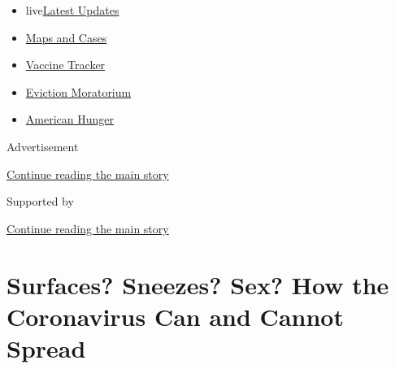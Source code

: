 \begin{itemize}
\tightlist
\item
  live\href{https://www.nytimes3xbfgragh.onion/2020/09/08/world/covid-19-coronavirus.html?name=styln-coronavirus-national\&region=TOP_BANNER\&block=storyline_menu_recirc\&action=click\&pgtype=Article\&impression_id=450a5011-f1e5-11ea-852f-a350b3d288e2\&variant=undefined}{Latest
  Updates}
\item
  \href{https://www.nytimes3xbfgragh.onion/interactive/2020/us/coronavirus-us-cases.html?name=styln-coronavirus-national\&region=TOP_BANNER\&block=storyline_menu_recirc\&action=click\&pgtype=Article\&impression_id=450a5012-f1e5-11ea-852f-a350b3d288e2\&variant=undefined}{Maps
  and Cases}
\item
  \href{https://www.nytimes3xbfgragh.onion/interactive/2020/science/coronavirus-vaccine-tracker.html?name=styln-coronavirus-national\&region=TOP_BANNER\&block=storyline_menu_recirc\&action=click\&pgtype=Article\&impression_id=450a5013-f1e5-11ea-852f-a350b3d288e2\&variant=undefined}{Vaccine
  Tracker}
\item
  \href{https://www.nytimes3xbfgragh.onion/2020/09/02/your-money/eviction-moratorium-covid.html?name=styln-coronavirus-national\&region=TOP_BANNER\&block=storyline_menu_recirc\&action=click\&pgtype=Article\&impression_id=450a5014-f1e5-11ea-852f-a350b3d288e2\&variant=undefined}{Eviction
  Moratorium}
\item
  \href{https://www.nytimes3xbfgragh.onion/interactive/2020/09/02/magazine/food-insecurity-hunger-us.html?name=styln-coronavirus-national\&region=TOP_BANNER\&block=storyline_menu_recirc\&action=click\&pgtype=Article\&impression_id=450a5015-f1e5-11ea-852f-a350b3d288e2\&variant=undefined}{American
  Hunger}
\end{itemize}

Advertisement

\protect\hyperlink{after-top}{Continue reading the main story}

Supported by

\protect\hyperlink{after-sponsor}{Continue reading the main story}

\hypertarget{surfaces-sneezes-sex-how-the-coronavirus-can-and-cannot-spread}{%
\section{Surfaces? Sneezes? Sex? How the Coronavirus Can and Cannot
Spread}\label{surfaces-sneezes-sex-how-the-coronavirus-can-and-cannot-spread}}

